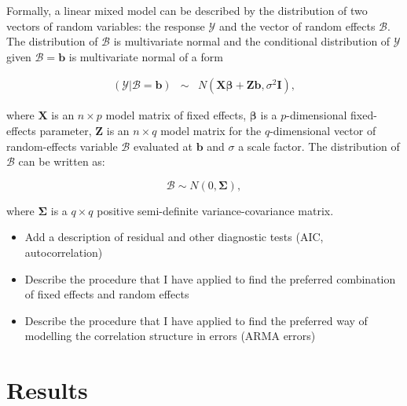 \documentclass[12pt]{iopart}
\begin{document}
Formally, a linear mixed model can be described by the distribution of two vectors of random variables: the response $\mathscr{Y}$ and the vector of random effects $\mathscr{B}$. The distribution of $\mathscr{B}$ is multivariate normal and the conditional distribution of $\mathscr{Y}$ given $\mathscr{B}=\mathbf{b}$ is multivariate normal of a form %




\begin{equation}\label{MixedGeneral}
\begin{array}{lcl}

(\mathscr{Y}|\mathscr{B}=\mathbf{b})& \sim & \mathit{N}(\mathbf{X}\mathbf{\beta}+\mathbf{Z}\mathbf{b},\sigma^2\mathbf{I}),

\end{array}
\end{equation}

where $\mathbf{X}$ is an $n \times p$ model matrix of fixed effects, $\mathbf{\beta}$ is a $p$-dimensional fixed-effects parameter, $\mathbf{Z}$ is an $n \times q$ model matrix for the $q$-dimensional vector of random-effects variable $\mathscr{B}$ evaluated at $\mathbf{b}$ and $\sigma$ a scale factor. The distribution of $\mathscr{B}$ can be written as: 

\begin{equation}\label{ranefDist}
\mathscr{B} \sim \mathit{N}(0,\mathbf{\Sigma}),
\end{equation}

where $\mathbf{\Sigma}$ is a $q \times q$ positive semi-definite variance-covariance matrix.

\color{blue}
\begin{itemize}
\item Add a description of residual and other diagnostic tests (AIC, autocorrelation)
\item Describe the procedure that I have applied to find the preferred combination of fixed effects and random effects
\item Describe the procedure that I have applied to find the preferred way of modelling the  correlation structure in errors (ARMA errors)
\end{itemize}
\color{black}





	\section{Results}\label{Results}
\end{document}
